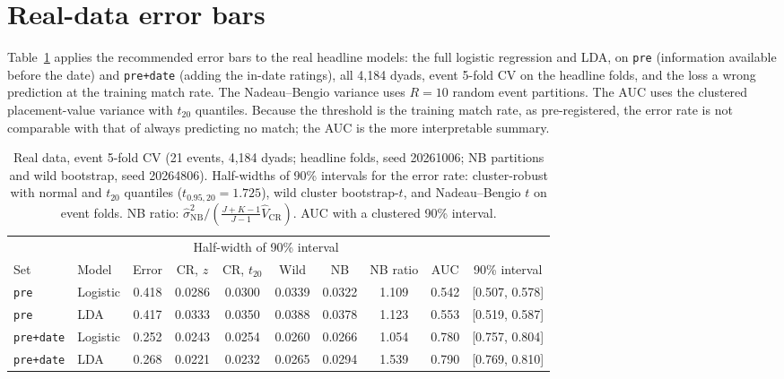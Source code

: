 \documentclass[11pt]{amsart}
\theoremstyle{plain}
\theoremstyle{definition}
\theoremstyle{remark}
\newcommand{\VCR}{\hat V_{\mathrm{CR}}}
\newcommand{\VNB}{\hat\sigma^2_{\mathrm{NB}}}
\newcommand{\fac}{\tfrac{J+K-1}{J-1}}
\begin{document}
\section{Real-data error bars}\label{sec:real}

Table~\ref{tab:real} applies the recommended error bars to the real headline models: the full logistic regression and LDA, on \texttt{pre} (information available before the date) and \texttt{pre+date} (adding the in-date ratings), all 4,184 dyads, event 5-fold CV on the headline folds, and the loss a wrong prediction at the training match rate. The Nadeau--Bengio variance uses $R=10$ random event partitions. The AUC uses the clustered placement-value variance \cite{Obuchowski} with $t_{20}$ quantiles. Because the threshold is the training match rate, as pre-registered, the error rate is not comparable with that of always predicting no match; the AUC is the more interpretable summary.

\begin{table}[tbp]
\centering\footnotesize
\caption{Real data, event 5-fold CV (21 events, 4,184 dyads; headline folds, seed 20261006; NB partitions and wild bootstrap, seed 20264806). Half-widths of 90\% intervals for the error rate: cluster-robust with normal and $t_{20}$ quantiles ($t_{0.95,20}=1.725$), wild cluster bootstrap-$t$, and Nadeau--Bengio $t$ on event folds. NB ratio: $\VNB/(\fac\VCR)$. AUC with a clustered 90\% interval.}\label{tab:real}
\begin{tabular}{@{}l l c c c c c c c c@{}}
\toprule
 & & & \multicolumn{4}{c}{Half-width of 90\% interval} & & & \\
\cmidrule(lr){4-7}
Set & Model & Error & CR, $z$ & CR, $t_{20}$ & Wild & NB & NB ratio & AUC & 90\% interval\\
\midrule
\texttt{pre} & Logistic & 0.418 & 0.0286 & 0.0300 & 0.0339 & 0.0322 & 1.109 & 0.542 & [0.507, 0.578] \\
\texttt{pre} & LDA & 0.417 & 0.0333 & 0.0350 & 0.0388 & 0.0378 & 1.123 & 0.553 & [0.519, 0.587] \\
\texttt{pre+date} & Logistic & 0.252 & 0.0243 & 0.0254 & 0.0260 & 0.0266 & 1.054 & 0.780 & [0.757, 0.804] \\
\texttt{pre+date} & LDA & 0.268 & 0.0221 & 0.0232 & 0.0265 & 0.0294 & 1.539 & 0.790 & [0.769, 0.810] \\
\bottomrule
\end{tabular}
\end{table}
\end{document}

